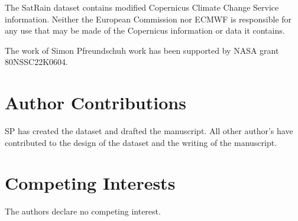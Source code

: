 \documentclass[11pt]{article}
\providecommand{\DIFaddbegin}{} %
\providecommand{\DIFaddend}{} %
\providecommand{\DIFdelbegin}{} %
\providecommand{\DIFdelend}{} %
\begin{document}
The SatRain dataset contains modified Copernicus Climate Change Service
information. Neither the European Commission nor ECMWF is responsible for any
use that may be made of the Copernicus information or data it contains.

The work of Simon Pfreundschuh work has been supported by NASA grant 80NSSC22K0604.


\section*{Author Contributions}

SP has created the dataset and drafted the manuscript. All other author's have
contributed to the design of the dataset and the writing of the manuscript.


\section*{Competing Interests}

The authors declare no competing interest.




\DIFdelbegin %
\DIFdelend \DIFaddbegin 
 \DIFaddend
\end{document}
